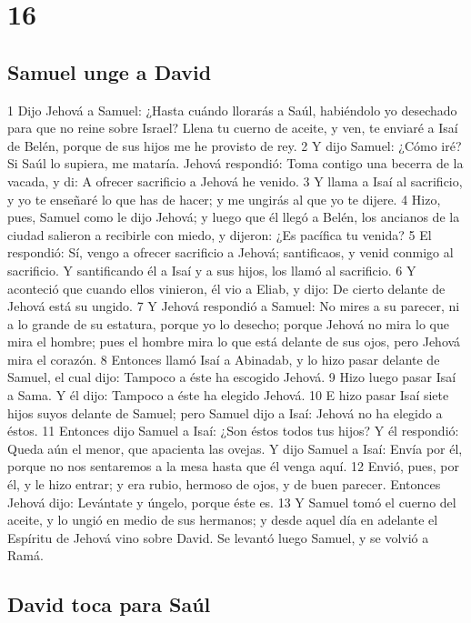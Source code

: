 \chapter{16}

\section*{Samuel unge a David}

1 Dijo Jehová a Samuel: ¿Hasta cuándo llorarás a Saúl, habiéndolo yo desechado para que no reine sobre Israel? Llena tu cuerno de aceite, y ven, te enviaré a Isaí de Belén, porque de sus hijos me he provisto de rey.
2 Y dijo Samuel: ¿Cómo iré? Si Saúl lo supiera, me mataría. Jehová respondió: Toma contigo una becerra de la vacada, y di: A ofrecer sacrificio a Jehová he venido.
3 Y llama a Isaí al sacrificio, y yo te enseñaré lo que has de hacer; y me ungirás al que yo te dijere.
4 Hizo, pues, Samuel como le dijo Jehová; y luego que él llegó a Belén, los ancianos de la ciudad salieron a recibirle con miedo, y dijeron: ¿Es pacífica tu venida?
5 El respondió: Sí, vengo a ofrecer sacrificio a Jehová; santificaos, y venid conmigo al sacrificio. Y santificando él a Isaí y a sus hijos, los llamó al sacrificio.
6 Y aconteció que cuando ellos vinieron, él vio a Eliab, y dijo: De cierto delante de Jehová está su ungido.
7 Y Jehová respondió a Samuel: No mires a su parecer, ni a lo grande de su estatura, porque yo lo desecho; porque Jehová no mira lo que mira el hombre; pues el hombre mira lo que está delante de sus ojos, pero Jehová mira el corazón.
8 Entonces llamó Isaí a Abinadab, y lo hizo pasar delante de Samuel, el cual dijo: Tampoco a éste ha escogido Jehová. 
9 Hizo luego pasar Isaí a Sama. Y él dijo: Tampoco a éste ha elegido Jehová.
10 E hizo pasar Isaí siete hijos suyos delante de Samuel; pero Samuel dijo a Isaí: Jehová no ha elegido a éstos.
11 Entonces dijo Samuel a Isaí: ¿Son éstos todos tus hijos? Y él respondió: Queda aún el menor, que apacienta las ovejas. Y dijo Samuel a Isaí: Envía por él, porque no nos sentaremos a la mesa hasta que él venga aquí.
12 Envió, pues, por él, y le hizo entrar; y era rubio, hermoso de ojos, y de buen parecer. Entonces Jehová dijo: Levántate y úngelo, porque éste es.
13 Y Samuel tomó el cuerno del aceite, y lo ungió en medio de sus hermanos; y desde aquel día en adelante el Espíritu de Jehová vino sobre David. Se levantó luego Samuel, y se volvió a Ramá.

\section*{David toca para Saúl}


